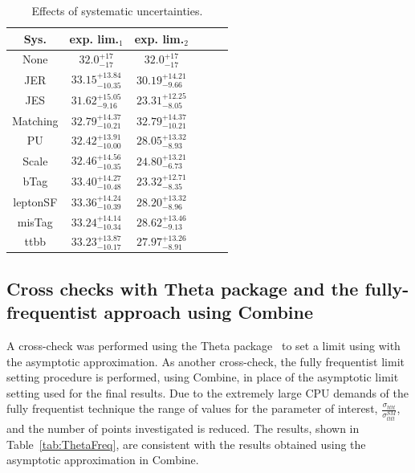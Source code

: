 \begin{table}[ht!]
\small
\centering
\begin{tabular}{|c |c |c | c | c | c |}
\hline
 Sys. &  exp. lim.$_{1}$ & exp. lim.$_{2}$   \\
 \hline  
None & $32.0^{+17}_{-17}$ & $32.0^{+17}_{-17}$ \\
 \hline 
 JER &    $33.15^{+13.84}_{-10.35}$  &  $30.19^{+14.21}_{-9.66}$    \\
 \hline  
 JES  & $31.62^{+15.05}_{-9.16}$ &  $23.31^{+12.25}_{-8.05}$     \\
\hline  
Matching &  $32.79^{+14.37}_{-10.21}$ & $32.79^{+14.37}_{-10.21}$     \\  
 \hline  
 PU    &  $32.42^{+13.91}_{-10.00}$  &  $28.05^{+13.32}_{-8.93}$    \\
 \hline  
 Scale  &  $32.46^{+14.56}_{-10.35}$ & $24.80^{+13.21}_{-6.73}$       \\
 \hline  
 bTag &  $33.40^{+14.27}_{-10.48}$ & $23.32^{+12.71}_{-8.35}$       \\
 \hline  
 leptonSF &  $33.36^{+14.24}_{-10.39}$  &  $28.20^{+13.32}_{-8.96}$   \\  
 \hline  
 misTag &  $33.24^{+14.14}_{-10.34}$  &  $28.62^{+13.46}_{-9.13}$  \\
 \hline  
 ttbb  &  $33.23^{+13.87}_{-10.17}$  &  $27.97^{+13.26}_{-8.91}$  \\
 \hline
\end{tabular}
\caption{Effects of systematic uncertainties. }
\label{tab:effectLims}
\end{table}

\subsection{Cross checks with Theta package and the fully-frequentist approach using Combine}

A cross-check was performed using the Theta package~\cite{theta} to set a limit using \CLS with the asymptotic approximation. As another cross-check, the fully frequentist \CLS limit setting procedure is performed, using Combine, in place of the asymptotic limit setting used for the final results. Due to the extremely large CPU demands of the fully frequentist technique the range of values for the parameter of interest, $\frac{\sigma_{tttt}}{\sigma_{tttt}^{SM}}$, and the number of points investigated is reduced. The results, shown in Table~\ref{tab:ThetaFreq}, are consistent with the results obtained using the asymptotic approximation in Combine.


